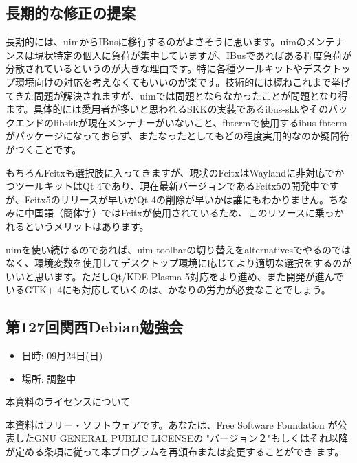 \documentclass[mingoth,a4paper]{jsarticle}
\begin{document}
\subsection{長期的な修正の提案}

長期的には、uimからIBusに移行するのがよさそうに思います。uimのメンテナンスは現状特定の個人に負荷が集中していますが、IBusであればある程度負荷が分散されているというのが大きな理由です。特に各種ツールキットやデスクトップ環境向けの対応を考えなくてもいいのが楽です。技術的には概ねこれまで挙げてきた問題が解決されますが、uimでは問題とならなかったことが問題となり得ます。具体的には愛用者が多いと思われるSKKの実装であるibus-skkやそのバックエンドのlibskkが現在メンテナーがいないこと、fbtermで使用するibus-fbtermがパッケージになっておらず、またなったとしてもどの程度実用的なのか疑問符がつくことです。

もちろんFcitxも選択肢に入ってきますが、現状のFcitxはWaylandに非対応でかつツールキットはQt
4であり、現在最新バージョンであるFcitx5の開発中ですが、Fcitx5のリリースが早いかQt
4の削除が早いかは誰にもわかりません。ちなみに中国語（簡体字）ではFcitxが使用されているため、このリソースに乗っかれるというメリットはあります。

uimを使い続けるのであれば、uim-toolbarの切り替えをalternativesでやるのではなく、環境変数を使用してデスクトップ環境に応じてより適切な選択をするのがいいと思います。ただしQt/KDE
Plasma 5対応をより進め、また開発が進んでいるGTK+
4にも対応していくのは、かなりの労力が必要なことでしょう。

\pagebreak

\subsection{第127回関西Debian勉強会}
\begin{itemize}
\item 日時: 09月24日(日)
\item 場所: 調整中
\end{itemize}


\mbox{}\newpage

\pagebreak

\begin{center}
本資料のライセンスについて
\end{center}

本資料はフリー・ソフトウェアです。あなたは、Free Software
Foundation が公表したGNU GENERAL PUBLIC LICENSEの "バージョン２"もしくはそれ以降
が定める条項に従って本プログラムを再頒布または変更することができ
ます。
\end{document}

